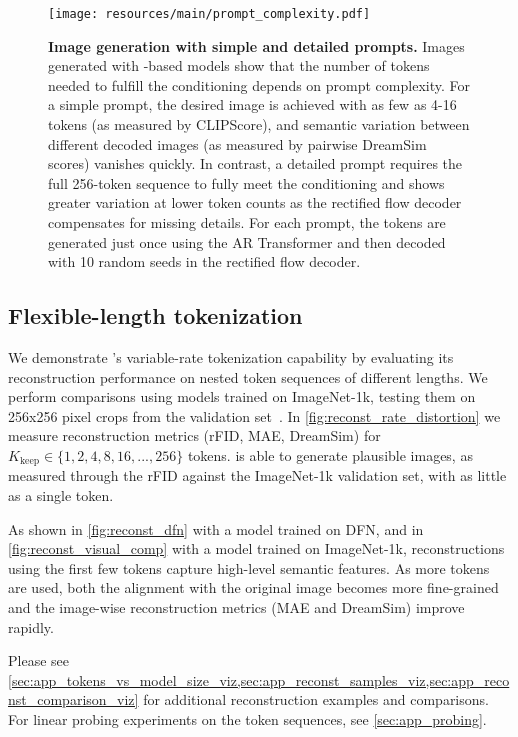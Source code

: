 \begin{figure*}[ht!]
\centering
\texttt{[image: resources/main/prompt\_complexity.pdf]}
\caption{
\textbf{Image generation with simple and detailed prompts.} 
Images generated with \ours-based models show that the number of tokens needed to fulfill the conditioning depends on prompt complexity. For a simple prompt, the desired image is achieved with as few as 4-16 tokens (as measured by CLIPScore), and semantic variation between different decoded images (as measured by pairwise DreamSim scores) vanishes quickly. 
In contrast, a detailed prompt requires the full 256-token sequence to fully meet the conditioning and shows greater variation at lower token counts as the \ours rectified flow decoder compensates for missing details. 
For each prompt, the \ours tokens are generated just once using the AR Transformer and then decoded with 10 random seeds in the rectified flow decoder.
}
\label{fig:gen_simple_vs_complex}
\end{figure*}

\subsection{Flexible-length tokenization}
\label{sec:flex_length_tok}
We demonstrate \ours's variable-rate tokenization capability by evaluating its reconstruction performance on nested token sequences of different lengths. We perform comparisons using \ours models trained on ImageNet-1k, testing them on 256x256 pixel crops from the validation set~\cite{Russakovsky2014ImageNet}. In \cref{fig:reconst_rate_distortion} we measure reconstruction metrics (rFID, MAE, DreamSim) for $K_\text{keep} \in \{1, 2, 4, 8, 16, ..., 256\}$ tokens. \ours is able to generate plausible images, as measured through the rFID against the ImageNet-1k validation set, with as little as a single token. 

As shown in \cref{fig:reconst_dfn} with a \oursxlarge model trained on DFN, and in \cref{fig:reconst_visual_comp} with a \oursxlarge model trained on ImageNet-1k, reconstructions using the first few tokens capture high-level semantic features. As more tokens are used, both the alignment with the original image becomes more fine-grained and the image-wise reconstruction metrics (MAE and DreamSim) improve rapidly. 

Please see \cref{sec:app_tokens_vs_model_size_viz,sec:app_reconst_samples_viz,sec:app_reconst_comparison_viz} for additional reconstruction examples and comparisons. For linear probing experiments on the token sequences, see \cref{sec:app_probing}.

